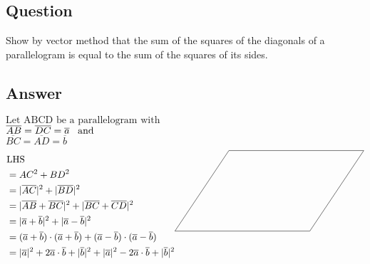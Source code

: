\documentclass[17pt]{extarticle}
\begin{document}
\noindent
\begin{fleqn} 


\section{Question}
Show by vector method that the sum of the squares of the diagonals of a parallelogram is equal to the sum of the squares of its sides.
\subsection*{Answer}
$\text{Let ABCD be a parallelogram with }$ \\
$\overline{AB} = \overline{DC} = \overline{a} \text{\;\;\;and}$\\
$\overline{BC} = \overline{AD} = \overline{b}$\\
\vspace{-0.5cm}
\begin{equation} \nonumber
\begin{alignedat}{4}
&\text{LHS } \\&= AC^2+BD^2 \\
&= |\overline{AC}|^2 + |\overline{BD}|^2\\
&= |\overline{AB}+\overline{BC}|^2 + |\overline{BC}+\overline{CD}|^2\\
&= |\overline{a}+\overline{b}|^2 + |\overline{a}-\overline{b}|^2\\
&= (\overline{a}+\overline{b})\cdot (\overline{a}+\overline{b})+(\overline{a}-\overline{b})\cdot(\overline{a}-\overline{b})\\
&= |\overline{a}|^2 + 2\overline{a} \cdot \overline{b}+|\overline{b}|^2 +|\overline{a}|^2 - 2\overline{a} \cdot \overline{b}+|\overline{b}|^2  \\
\end{alignedat}
\begin{alignedat}{4}
\begin{tikzpicture}
\draw (0,0) -- (2,3) -- (7,3) -- (5,0) -- (0,0); 
\end{tikzpicture}
\\\\ \    %
\end{alignedat}
\end{equation}
\vspace{-0.2cm}

\end{fleqn}
\end{document}

